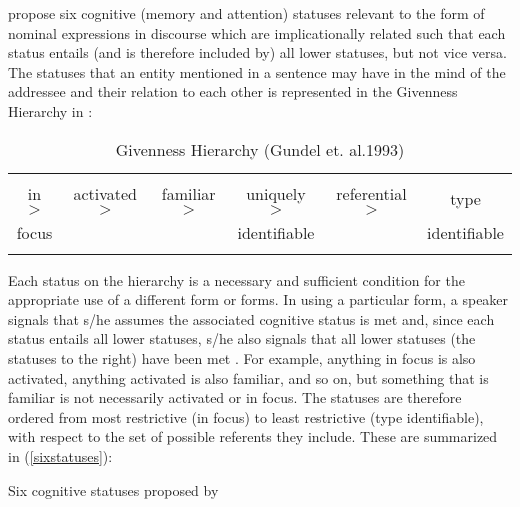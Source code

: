 \citet{gundel1993} propose six cognitive (memory and attention) statuses relevant to the form of nominal expressions in discourse which are implicationally related such that each status entails (and is therefore included by) all lower statuses, but not vice versa. The statuses that an entity mentioned in a sentence may have in the mind of the addressee and their relation to each other is represented in the Givenness Hierarchy in :

\begin{table}[htp] 
\begin{center}
\begin{tabular}{| c c c c c c |}
\hline
& & & & & \\
in $>$ & activated $>$ & familiar  $>$ & uniquely  $>$ & referential $>$ & type \\
focus &  &  &   identifiable  &  & identifiable \\
& & & & &  \\
\hline
\end{tabular}\caption{\small{Givenness Hierarchy (Gundel et. al.1993)}}
\label{givennesshierarchy} 
\end{center}
\end{table}
Each status on the hierarchy is a necessary and sufficient condition for the appropriate use of a different form or forms. In using a particular form, a speaker signals that s/he assumes the associated cognitive status is met and, since each status entails all lower statuses, s/he also signals that all lower statuses (the statuses to the right) have been met \citep[275]{gundel1993}. For example, anything in focus is also activated, anything activated is also familiar, and so on, but something that is familiar is not necessarily activated or in focus. The statuses are therefore ordered from most restrictive (in focus) to least restrictive (type identifiable), with respect to the set of possible referents they include. These are summarized in (\ref{sixstatuses}):

\ea\label{sixstatuses} Six cognitive statuses proposed by \citet{gundel1993}

